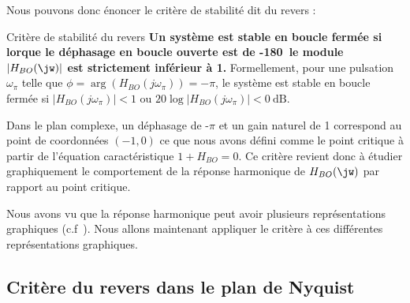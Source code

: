 Nous pouvons donc énoncer le critère de stabilité dit du revers :
\begin{criteria}{Critère de stabilité du revers}
    \textbf{Un système est stable en boucle fermée si lorque le 
    déphasage en boucle ouverte est de -180\degree~le module $|H_{BO}(\jw)|$ 
    est strictement inférieur à 1.}
    Formellement, pour une pulsation $\omega_{\pi}$ telle que 
    $\phi=\arg{\left(H_{BO}(j\omega_\pi)\right)}=-\pi$, 
    le système est stable en boucle fermée si $|H_{BO}(j\omega_\pi)|<1$ ou 
    $20\log{|H_{BO}(j\omega_\pi)|}<\SI{0}{\dB}$.
\end{criteria}
Dans le plan complexe, un  déphasage de -$\pi$ et un gain naturel de 1 
correspond au point de coordonnées $(-1,0)$ ce que nous avons défini comme 
le point critique à partir de l'équation caractéristique $1+H_{BO}=0$. 
Ce critère revient donc à étudier graphiquement le comportement 
de la réponse harmonique de $H_{BO}(\jw)$ par rapport au point critique.

Nous avons vu que la réponse harmonique peut avoir plusieurs représentations
graphiques (c.f~). Nous allons maintenant appliquer le 
critère à ces différentes représentations graphiques.

\clearpage
\subsection{Critère du revers dans le plan de Nyquist
}

